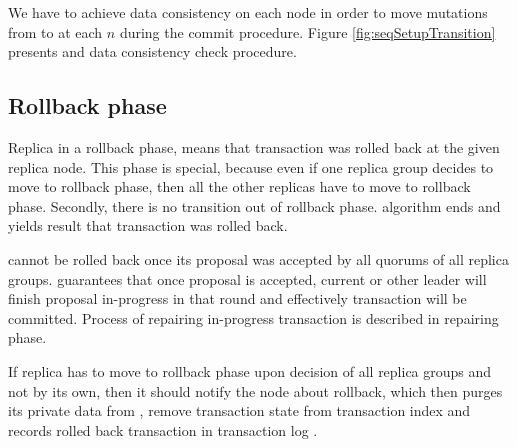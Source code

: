 We have to achieve data consistency on each node in order to move mutations from \txStorage to \database at each $n$ during the commit procedure. Figure \ref{fig:seqSetupTransition} presents \setupTransition and data consistency check procedure.
















\subsection{Rollback phase}
Replica in a rollback phase, means that transaction was rolled back at the given replica node. 
This phase is special, because even if one replica group decides to move to rollback phase, then all the other replicas have to move to rollback phase. Secondly, there is no transition out of rollback phase. \mpt algorithm ends and yields result that transaction was rolled back.

\transaction cannot be rolled back once its proposal was accepted by all quorums of all replica groups. \paxos guarantees that once proposal is accepted, current or other leader will finish proposal in-progress in that round and effectively transaction will be committed. Process of repairing in-progress transaction is described in repairing phase.

If replica has to move to rollback phase upon decision of all replica groups and not by its own, then it should notify the node about rollback, which then purges its private data from \txStorage, remove transaction state \txState from transaction index \txIndex and records rolled back transaction \transaction in transaction log \txLog.


